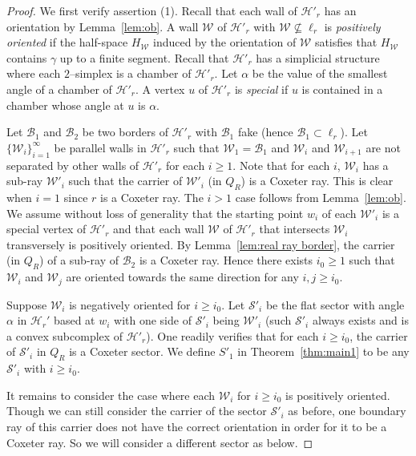 \documentclass[11pt]{amsart}
\newcommand {\B}{\mathcal B}
\newcommand {\h}{\mathcal H}
\newcommand {\W}{\mathcal W}
\newcommand {\s}{\mathcal S}
\theoremstyle{definition}
\begin{document}
\begin{proof}
	We first verify assertion (1). Recall that each wall of $\h'_r$ has an orientation by Lemma~\ref{lem:ob}. A wall $\W$ of $\h'_r$ with $\W\nsubseteq \ell_r$ is \emph{positively oriented} if the half-space $H_\W$ induced by the orientation of $\W$ satisfies that $H_\W$ contains $\gamma$ up to a finite segment. Recall that $\h'_r$ has a simplicial structure where each $2$--simplex is a chamber of $\h'_r$. Let $\alpha$ be the value of the smallest angle of a chamber of $\h'_r$. A vertex $u$ of $\h'_r$ is \emph{special} if $u$ is contained in a chamber whose angle at $u$ is $\alpha$. 
	
	Let $\B_1$ and $\B_2$ be two borders of $\h'_r$ with $\B_1$ fake (hence $\B_1\subset \ell_r$). Let $\{\W_i\}_{i=1}^{\infty}$ be parallel walls in $\h'_r$ such that $\W_1=\B_1$ and $\W_i$ and $\W_{i+1}$ are not separated by other walls of $\h'_r$ for each $i\ge 1$. Note that for each $i$, $\W_i$ has a sub-ray $\W'_i$ such that the carrier of $\W'_i$ (in $Q_R$) is a Coxeter ray. This is clear when $i=1$ since $r$ is a Coxeter ray. The $i>1$ case follows from Lemma~\ref{lem:ob}. We assume without loss of generality that the starting point $w_i$ of each $\W'_i$ is a special vertex of $\h'_r$ and that each wall $\W$ of $\h'_r$ that intersects $\W_i$ transversely is positively oriented. By Lemma~\ref{lem:real ray border}, the carrier (in $Q_R$) of a sub-ray of $\B_2$ is a Coxeter ray. Hence there exists $i_0\ge 1$ such that $\W_i$ and $\W_j$ are oriented towards the same direction for any $i,j\ge i_0$. 
	
	Suppose $\W_i$ is negatively oriented for $i\ge i_0$. Let $\s'_i$ be the flat sector with angle $\alpha$ in $\h_r'$ based at $w_i$ with one side of $\s'_i$ being $\W'_i$ (such $\s'_i$ always exists and is a convex subcomplex of $\h'_r$). One readily verifies that for each $i\ge i_0$, the carrier of $\s'_i$ in $Q_R$ is a Coxeter sector. We define $S'_1$ in Theorem~\ref{thm:main1} to be any $\s'_i$ with $i\ge i_0$.
	
	It remains to consider the case where each $\W_i$ for $i\ge i_0$ is positively oriented. Though we can still consider the carrier of the sector $\s'_i$ as before, one boundary ray of this carrier does not have the correct orientation in order for it to be a Coxeter ray. So we will consider a different sector as below.
	

\end{proof}
\end{document}
